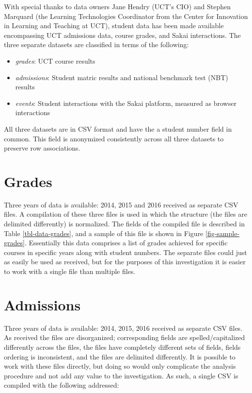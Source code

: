 With special thanks to data owners Jane Hendry (UCT's CIO) and Stephen Marquard (the Learning Technologies Coordinator from the Center for Innovation in Learning and Teaching at UCT), student data has been made available encompassing UCT admissions data, course grades, and Sakai interactions. The three separate datasets are classified in terms of the following:

\begin{itemize}
    \item \textit{grades}: UCT course results
    \item \textit{admissions}: Student matric results and national benchmark test (NBT) results
    \item \textit{events}: Student interactions with the Sakai platform, measured as browser interactions
\end{itemize}

All three datasets are in CSV format and have the a student number field in common. This field is anonymized consistently across all three datasets to preserve row associations.

\section{Grades}
Three years of data is available: 2014, 2015 and 2016 received as separate CSV files. A compilation of these three files is used in which the structure (the files are delimited differently) is normalized. The fields of the compiled file is described in Table \ref{tbl-data-grades}, and a sample of this file is shown in Figure \ref{fig-sample-grades}. Essentially this data comprises a list of grades achieved for specific courses in specific years along with student numbers. The separate files could just as easily be used as received, but for the purposes of this investigation it is easier to work with a single file than multiple files.




\section{Admissions}
Three years of data is available: 2014, 2015, 2016 received as separate CSV files. As received the files are disorganized; corresponding fields are spelled/capitalized differently across the files, the files have completely different sets of fields, fields ordering is inconsistent, and the files are delimited differently. It is possible to work with these files directly, but doing so would only complicate the analysis procedure and not add any value to the investigation. As such, a single CSV is compiled with the following addressed:

